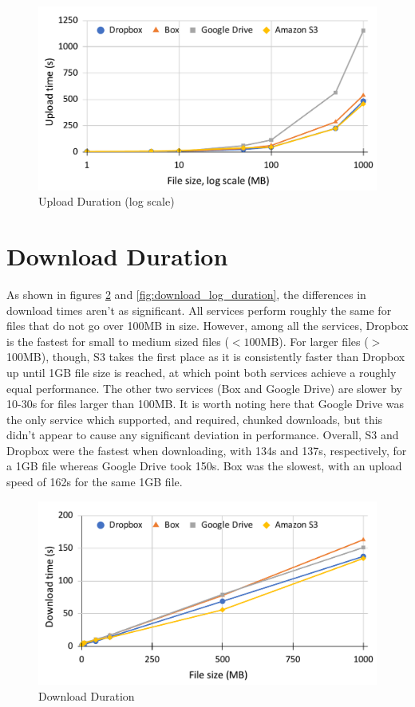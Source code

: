 \begin{figure} [!h]
	\centering
	\includegraphics[scale=0.6]{images/upload_log_chart}
	\caption{\label{fig:upload_log_duration}Upload Duration (log scale)}
\end{figure}

\section{Download Duration}
As shown in figures \ref{fig:download_duration} and \ref{fig:download_log_duration}, the differences in download times aren't as significant. All services perform roughly the same for files that do not go over 100MB in size. However, among all the services, Dropbox is the fastest for small to medium sized files ($< 100$MB). For larger files ($ >$100MB), though, S3 takes the first place as it is consistently faster than Dropbox up until 1GB file size is reached, at which point both services achieve a roughly equal performance. The other two services (Box and Google Drive) are slower by 10-30s for files larger than 100MB. It is worth noting here that Google Drive was the only service which supported, and required, chunked downloads, but this didn't appear to cause any significant deviation in performance. Overall, S3 and Dropbox were the fastest when downloading, with 134s and 137s, respectively, for a 1GB file whereas Google Drive took 150s. Box was the slowest, with an upload speed of 162s for the same 1GB file.

\begin{figure} [!h]
	\centering
	\includegraphics[scale=0.6]{images/download_chart}
	\caption{\label{fig:download_duration}Download Duration}
\end{figure}

